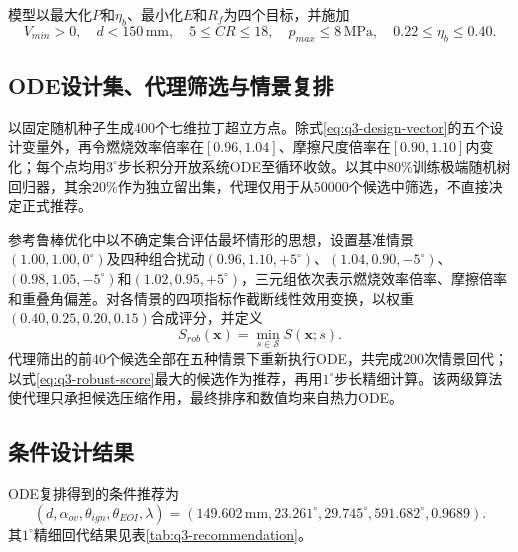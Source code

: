 \documentclass[withoutpreface,bwprint]{cumcmthesis}
\begin{document}
模型以最大化$P$和$\eta_b$、最小化$E$和$R_f$为四个目标，并施加
\begin{equation}
 V_{min}>0,\quad d<150\,\mathrm{mm},\quad 5\le CR\le18,
 \quad p_{max}\le8\,\mathrm{MPa},\quad0.22\le\eta_b\le0.40.
 \label{eq:q3-constraints}
\end{equation}

\subsection{ODE设计集、代理筛选与情景复排}

以固定随机种子生成$400$个七维拉丁超立方点\cite{mckay1979lhs}。除式\eqref{eq:q3-design-vector}的五个设计变量外，再令燃烧效率倍率在$[0.96,1.04]$、摩擦尺度倍率在$[0.90,1.10]$内变化；每个点均用$3^\circ$步长积分开放系统ODE至循环收敛。以其中$80\%$训练极端随机树回归器\cite{geurts2006extraTrees}，其余$20\%$作为独立留出集，代理仅用于从$50000$个候选中筛选，不直接决定正式推荐。

参考鲁棒优化中以不确定集合评估最坏情形的思想\cite{bental2002robust}，设置基准情景$(1.00,1.00,0^\circ)$及四种组合扰动$(0.96,1.10,+5^\circ)$、$(1.04,0.90,-5^\circ)$、$(0.98,1.05,-5^\circ)$和$(1.02,0.95,+5^\circ)$，三元组依次表示燃烧效率倍率、摩擦倍率和重叠角偏差。对各情景的四项指标作截断线性效用变换，以权重$(0.40,0.25,0.20,0.15)$合成评分，并定义
\begin{equation}
 S_{rob}(\boldsymbol{x})=\min_{s\in\mathcal S}S(\boldsymbol{x};s).
 \label{eq:q3-robust-score}
\end{equation}
代理筛出的前$40$个候选全部在五种情景下重新执行ODE，共完成$200$次情景回代；以式\eqref{eq:q3-robust-score}最大的候选作为推荐，再用$1^\circ$步长精细计算。该两级算法使代理只承担候选压缩作用，最终排序和数值均来自热力ODE。

\subsection{条件设计结果}

ODE复排得到的条件推荐为
\begin{equation}
 (d,\alpha_{ov},\theta_{ign},\theta_{EOI},\lambda)
 =(149.602\,\mathrm{mm},23.261^\circ,29.745^\circ,591.682^\circ,0.9689).
 \label{eq:q3-recommendation}
\end{equation}
其$1^\circ$精细回代结果见表\ref{tab:q3-recommendation}。
\end{document}
